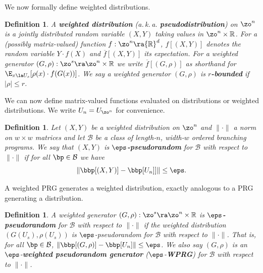 \documentclass[11pt]{article}
\newtheorem{definition}[theorem]{Definition}
\newcommand{\R}{{\mathbb R}}
\begin{document}
We now formally %
define  %
weighted distributions.
\begin{definition}
A \textbf{weighted distribution} %
(a.\,k.\,a.  %
\textbf{pseudodistribution}) on $\zo^n$ is a jointly distributed random variable $(X,Y)$ taking values in $\zo^n\times \R$. For a (possibly %
matrix-valued) %
function $f:\zo^n\ra\R^d$, $f[(X,Y)]$ denotes the random variable $Y\cdot f(X)$ and $\overline{f}[(X,Y)]$ its expectation. For a weighted generator $(G,\rho):\zo^s\ra \zo^n\times \R$ we write $\overline{f}[(G,\rho)]$ as shorthand for $\E_{x\la U_s}[\rho(x)\cdot f(G(x))]$. We say a weighted generator $(G,\rho)$ is \textbf{$r$-bounded} if $|\rho|\leq r$.
\end{definition}
We can now define %
matrix-valued %
functions evaluated on distributions or weighted distributions. We write $U_n=U_{\zo^n}$ for convenience.
\begin{definition}
    Let $(X,Y)$ be a weighted distribution on $\zo^n$ and $\|\cdot\|$ a norm on $w\times w$ matrices and let $\mathcal{B}$ be a class of %
    length-$n$, width-$w$ %
    ordered branching programs. We say that $(X,Y)$ is \textbf{$\eps$-pseudorandom} for $\mathcal{B}$  with respect to $\|\cdot\|$  if for all $\bp \in \mathcal{B}$ we have
    $$\left\| \bbp[(X,Y)] - \bbp[U_n]]\right\|\leq \eps.$$
\end{definition}
A weighted PRG generates a weighted distribution, exactly analogous to a PRG generating a distribution.
\begin{definition}
A weighted generator $(G,\rho):\zo^s\ra\zo^n\times\R$ is \textbf{$\eps$-pseudorandom} for $\mathcal{B}$ with respect to $\|\cdot\|$ if the weighted distribution $(G(U_s),\rho(U_s))$ is $\eps$-pseudorandom for $\mathcal{B}$ with respect to $\|\cdot\|$. That is, for all $\bp\in \mathcal{B}$, $\|\bbp[(G,\rho)]-\bbp[U_n]\|\leq \eps$. We also say $(G,\rho)$ is an $\eps$-\textbf{weighted pseudorandom generator} ($\eps$-\textbf{WPRG}) for $\mathcal{B}$ with respect to $\|\cdot\|$.
\end{definition}
\end{document}
